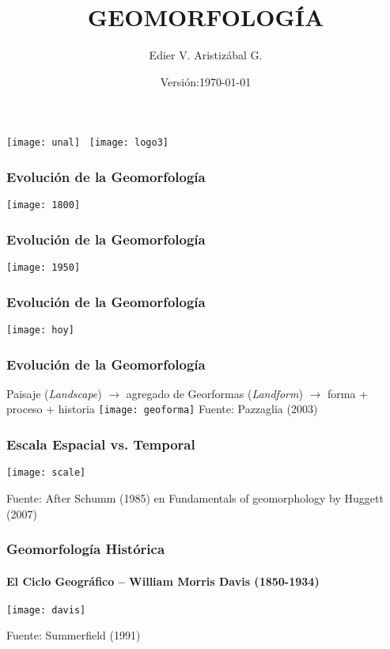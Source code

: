\documentclass[]{beamer}
\title[Modelos de Evolución del Paisaje]{GEOMORFOLOGÍA}
\author[Edier Aristizábal]{Edier V. Aristizábal G.}
\institute{evaristizabalg@unal.edu.co}
\date{Versión:\today}
\begin{document}
\begin{frame}
\titlepage
	\texttt{[image: unal]}\hspace*{4.75cm}~%
   	\texttt{[image: logo3]} 
\end{frame}
\begin{frame}
\frametitle{Evolución de la Geomorfología}
\begin{center}
\texttt{[image: 1800]}
\end{center}
\end{frame}
\begin{frame}
\frametitle{Evolución de la Geomorfología}
\begin{center}
\texttt{[image: 1950]}
\end{center}
\end{frame}
\begin{frame}
\frametitle{Evolución de la Geomorfología}
\texttt{[image: hoy]}
\end{frame}
\begin{frame}
\frametitle{Evolución de la Geomorfología}
\small{Paisaje (\emph{Landscape}) $\rightarrow$ agregado de Georformas (\emph{Landform}) $\rightarrow$ forma + proceso + historia}\vfill
\texttt{[image: geoforma]}\vfill
\tiny{Fuente: Pazzaglia (2003)}
\end{frame}
\begin{frame}
\frametitle{Escala Espacial vs. Temporal}
\begin{center}
\texttt{[image: scale]}
\end{center}
\tiny{Fuente: After Schumm (1985) en Fundamentals of geomorphology by Huggett (2007)}
\end{frame}
\begin{frame}
\frametitle{Geomorfología Histórica}
\framesubtitle{El Ciclo Geográfico – William Morris Davis (1850-1934)}
\begin{center}
\texttt{[image: davis]}
\end{center}
\tiny{Fuente: Summerfield  (1991)}
\end{frame}
\end{document}
